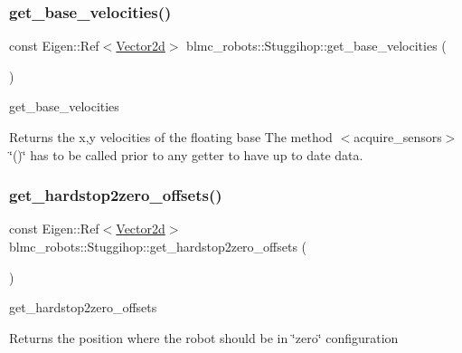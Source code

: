 \subsubsection{\texorpdfstring{get\+\_\+base\+\_\+velocities()}{get\_base\_velocities()}}
{\footnotesize\ttfamily const Eigen\+::\+Ref$<$\hyperlink{common__header_8hpp_acb6916bc8c9fe9d98c484fd4cc201447}{Vector2d}$>$ blmc\+\_\+robots\+::\+Stuggihop\+::get\+\_\+base\+\_\+velocities (\begin{DoxyParamCaption}{ }\end{DoxyParamCaption})\hspace{0.3cm}{\ttfamily [inline]}}



get\+\_\+base\+\_\+velocities 

\begin{DoxyReturn}{Returns}
the x,y velocities of the floating base The method $<$acquire\+\_\+sensors$>$\char`\"{}()\char`\"{} has to be called prior to any getter to have up to date data. 
\end{DoxyReturn}
\mbox{\label{classblmc__robots_1_1Stuggihop_a0669e1c16bd6698966149cebad9c43fc}} 
\subsubsection{\texorpdfstring{get\+\_\+hardstop2zero\+\_\+offsets()}{get\_hardstop2zero\_offsets()}}
{\footnotesize\ttfamily const Eigen\+::\+Ref$<$\hyperlink{common__header_8hpp_acb6916bc8c9fe9d98c484fd4cc201447}{Vector2d}$>$ blmc\+\_\+robots\+::\+Stuggihop\+::get\+\_\+hardstop2zero\+\_\+offsets (\begin{DoxyParamCaption}{ }\end{DoxyParamCaption})\hspace{0.3cm}{\ttfamily [inline]}}



get\+\_\+hardstop2zero\+\_\+offsets 

\begin{DoxyReturn}{Returns}
the position where the robot should be in \char`\"{}zero\char`\"{} configuration 
\end{DoxyReturn}
\mbox{\label{classblmc__robots_1_1Stuggihop_afc0dfd7c91f9a83126ed6644ae29ed20}} 
